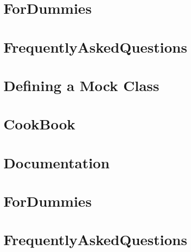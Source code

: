 \documentclass[twoside]{book}
\newcommand{\+}{\discretionary{\mbox{\scriptsize$\hookleftarrow$}}{}{}}
\begin{document}
\chapter{For\+Dummies}
\label{md_vendor_googletest_googlemock_docs_v1_5_ForDummies}

\chapter{Frequently\+Asked\+Questions}
\label{md_vendor_googletest_googlemock_docs_v1_5_FrequentlyAskedQuestions}

\chapter{Defining a Mock Class}
\label{md_vendor_googletest_googlemock_docs_v1_6_CheatSheet}

\chapter{Cook\+Book}
\label{md_vendor_googletest_googlemock_docs_v1_6_CookBook}

\chapter{Documentation}
\label{md_vendor_googletest_googlemock_docs_v1_6_Documentation}

\chapter{For\+Dummies}
\label{md_vendor_googletest_googlemock_docs_v1_6_ForDummies}

\chapter{Frequently\+Asked\+Questions}
\label{md_vendor_googletest_googlemock_docs_v1_6_FrequentlyAskedQuestions}

\end{document}
